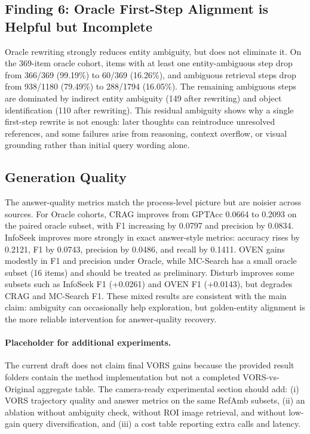 \documentclass{article}
\begin{document}
\subsection{Finding 6: Oracle First-Step Alignment is Helpful but Incomplete}
Oracle rewriting strongly reduces entity ambiguity, but does not eliminate it.
On the 369-item oracle cohort, items with at least one entity-ambiguous step drop from 366/369 (99.19\%) to 60/369 (16.26\%), and ambiguous retrieval steps drop from 938/1180 (79.49\%) to 288/1794 (16.05\%).
The remaining ambiguous steps are dominated by indirect entity ambiguity (149 after rewriting) and object identification (110 after rewriting).
This residual ambiguity shows why a single first-step rewrite is not enough: later thoughts can reintroduce unresolved references, and some failures arise from reasoning, context overflow, or visual grounding rather than initial query wording alone.



\subsection{Generation Quality}
The answer-quality metrics match the process-level picture but are noisier across sources.
For Oracle cohorts, CRAG improves from GPTAcc 0.0664 to 0.2093 on the paired oracle subset, with F1 increasing by 0.0797 and precision by 0.0834.
InfoSeek improves more strongly in exact answer-style metrics: accuracy rises by 0.2121, F1 by 0.0743, precision by 0.0486, and recall by 0.1411.
OVEN gains modestly in F1 and precision under Oracle, while MC-Search has a small oracle subset (16 items) and should be treated as preliminary.
Disturb improves some subsets such as InfoSeek F1 (+0.0261) and OVEN F1 (+0.0143), but degrades CRAG and MC-Search F1.
These mixed results are consistent with the main claim: ambiguity can occasionally help exploration, but golden-entity alignment is the more reliable intervention for answer-quality recovery.

\paragraph{Placeholder for additional experiments.}
The current draft does not claim final VORS gains because the provided result folders contain the method implementation but not a completed VORS-vs-Original aggregate table.
The camera-ready experimental section should add: (i) VORS trajectory quality and answer metrics on the same RefAmb subsets, (ii) an ablation without ambiguity check, without ROI image retrieval, and without low-gain query diversification, and (iii) a cost table reporting extra calls and latency.
\end{document}
